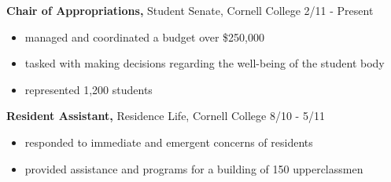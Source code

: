 \documentclass[margin]{res}
\begin{document}
\begin{resume}
{\bf Chair of Appropriations,} Student Senate, Cornell College \hfill 2/11 - Present
\begin{itemize} \itemsep -2pt %
  \item managed and coordinated a budget over \$250,000
  \item tasked with making decisions regarding the well-being of the student body
  \item represented 1,200 students
\end{itemize}

{\bf Resident Assistant,} Residence Life, Cornell College \hfill 8/10 - 5/11
\begin{itemize} \itemsep -2pt  %
  \item responded to immediate and emergent concerns of residents
  \item provided assistance and programs for a building of 150 upperclassmen
\end{itemize}





\end{resume}
\end{document}
